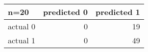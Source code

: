 \begin{tabular}{lrr}
\toprule
{n=20} & predicted 0 & predicted 1 \\
\midrule
actual 0 &           0 &          19 \\
actual 1 &           0 &          49 \\
\bottomrule
\end{tabular}
